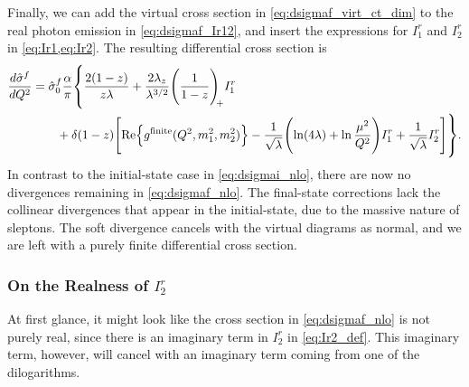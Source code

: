 Finally, we can add the virtual cross section in \cref{eq:dsigmaf_virt_ct_dim} to the real photon emission in \cref{eq:dsigmaf_Ir12}, and insert the expressions for $I^r_1$ and $I^r_2$ in \cref{eq:Ir1,eq:Ir2}.
The resulting differential cross section is
\begin{equation}
\begin{split}
    \frac{d\hat\sigma^f}{dQ^2} &= \hat\sigma^f_0 \frac{\alpha}{\pi} \vastl\{
        \frac{2(1-z)}{z\lambda}
        + \frac{2\lambda_z}{\lambda^{3/2}} \plusdist I^r_1
        \\ &\qquad
        + \delta(1-z) \Biggl[
            \Re\Bigl\{ g^{\mathrm{finite}}(Q^2,m_1^2,m_2^2) \Bigr\}
            - \frac{1}{\sqrt{\lambda}} \Biggl(
                \ln(4\lambda)
                + \ln\frac{\mu^2}{Q^2}
            \Biggr) I^r_1
            + \frac{1}{\sqrt{\lambda}} I^r_2
        \Biggr]
    \vastr\}.
\end{split}
\label{eq:dsigmaf_nlo}
\end{equation}
In contrast to the initial-state case in \cref{eq:dsigmai_nlo}, there are now no divergences remaining in \cref{eq:dsigmaf_nlo}.
The final-state corrections lack the collinear divergences that appear in the initial-state, due to the massive nature of sleptons. The soft divergence cancels with the virtual diagrams as normal, and we are left with a purely finite differential cross section.

\subsubsection{On the Realness of \texorpdfstring{$I^r_2$}{Ir2}}
At first glance, it might look like the cross section in \cref{eq:dsigmaf_nlo} is not purely real, since there is an imaginary term in $I^r_2$ in \cref{eq:Ir2_def}.
This imaginary term, however, will cancel with an imaginary term coming from one of the dilogarithms.

